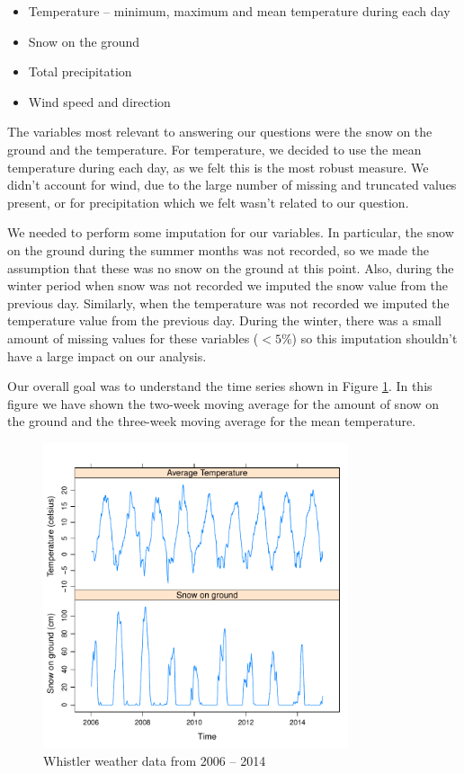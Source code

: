 \documentclass[12pt,twoside]{article}
\begin{document}
{\begin{itemize}
\item Temperature -- minimum, maximum and mean temperature during each day
\item Snow on the ground 
\item Total precipitation 
\item Wind speed and direction
\end{itemize}

\medskip\noindent The variables most relevant to answering our questions were the snow on the ground and the temperature. For temperature, we decided to use the mean temperature during each day, as we felt this is the most robust measure. We didn't account for wind, due to the large number of missing and truncated values present, or for precipitation which we felt wasn't related to our question. 

We needed to perform some imputation for our variables. In particular, the snow on the ground during the summer months was not recorded, so we made the assumption that these was no snow on the ground at this point. Also, during the winter period when snow was not recorded we imputed the snow value from the previous day. Similarly, when the temperature was not recorded we imputed the temperature value from the previous day. During the winter, there was a small amount of missing values for these variables ($<5\%$) so this imputation shouldn't have a large impact on our analysis.

Our overall goal was to understand the time series shown in Figure \ref{fig:basicts}. In this figure we have shown the two-week moving average for the amount of snow on the ground and the three-week moving average for the mean temperature.


\begin{figure}[!ht]
\begin{center}
\includegraphics[width=0.8\textwidth]{report-basicts}
\end{center}
\caption{Whistler weather data from 2006 -- 2014}
\label{fig:basicts}
\end{figure}

}
\end{document}
